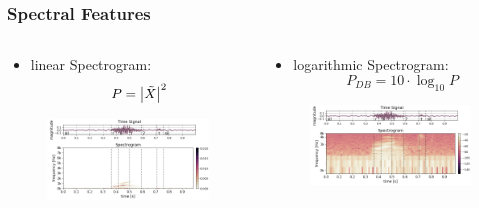 \begin{frame}
  \frametitle{Spectral Features}
  \begin{columns}
    \begin{column}{0.5\textwidth}
      \begin{itemize}
        \item linear Spectrogram:
        \begin{equation*}
          P = \abs{\tilde{X}}^2
        \end{equation*}
      \end{itemize}
      \begin{figure} \includegraphics[width=1.0\textwidth]{../3_signal/figs/signal_spec-lin_showcase_right0.png} \end{figure}
    \end{column}
    \begin{column}{0.5\textwidth}
      \begin{itemize}
        \item logarithmic Spectrogram:
        \vspace{0.25cm}
        \begin{equation*}
          P_{DB} = 10 \cdot \log_{10}{P}
        \end{equation*}
      \end{itemize}
      \vspace{0.08cm}
      \begin{figure} \includegraphics[width=1.0\textwidth]{../3_signal/figs/signal_spec-log_showcase_right0.png} \end{figure}
    \end{column}
  \end{columns}
\end{frame}

